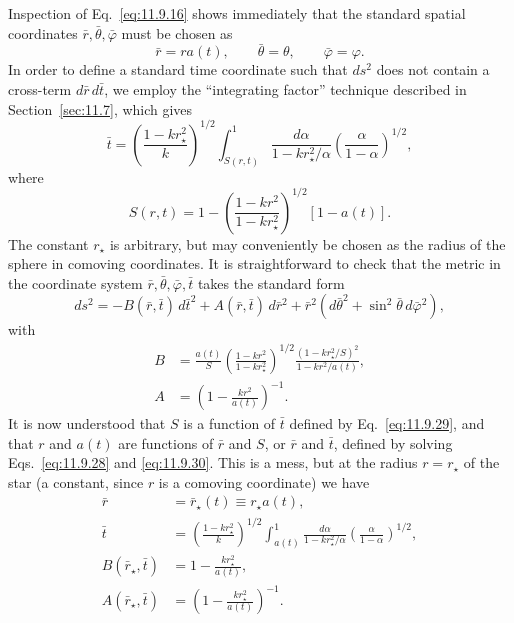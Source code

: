 Inspection of Eq.~\eqref{eq:11.9.16} shows immediately that the standard
spatial coordinates \(\bar r,\bar\theta,\bar\varphi\) must be chosen as
\begin{equation}
  \bar r=ra(t),\qquad
  \bar\theta=\theta,\qquad
  \bar\varphi=\varphi.
  \tag{11.9.28}\label{eq:11.9.28}
\end{equation}
In order to define a standard time coordinate such that \(ds^2\) does not
contain a cross-term \(d\bar r\,d\bar t\), we employ the ``integrating
factor'' technique described in Section~\ref{sec:11.7}, which gives
\begin{equation}
  \bar t
  =
  \left(\frac{1-kr_\star^2}{k}\right)^{1/2}
  \int_{S(r,t)}^1
  \frac{d\alpha}{1-kr_\star^2/\alpha}
  \left(\frac{\alpha}{1-\alpha}\right)^{1/2},
  \tag{11.9.29}\label{eq:11.9.29}
\end{equation}
where
\begin{equation}
  S(r,t)
  =
  1-
  \left(\frac{1-kr^2}{1-kr_\star^2}\right)^{1/2}
  [1-a(t)].
  \tag{11.9.30}\label{eq:11.9.30}
\end{equation}
The constant \(r_\star\) is arbitrary, but may conveniently be chosen as the
radius of the sphere in comoving coordinates. It is straightforward to check
that the metric in the coordinate system
\(\bar r,\bar\theta,\bar\varphi,\bar t\) takes the standard form
\[
  ds^2
  =
  -B(\bar r,\bar t)\,d\bar t^2
  +A(\bar r,\bar t)\,d\bar r^2
  +\bar r^2(d\bar\theta^2+\sin^2\bar\theta\,d\bar\varphi^2),
\]
with
\begin{align}
  B
  &=
  \frac{a(t)}{S}
  \left(\frac{1-kr^2}{1-kr_\star^2}\right)^{1/2}
  \frac{(1-kr_\star^2/S)^2}{1-kr^2/a(t)},
  \tag{11.9.31}\label{eq:11.9.31}\\
  A
  &=
  \left(1-\frac{kr^2}{a(t)}\right)^{-1}.
  \tag{11.9.32}\label{eq:11.9.32}
\end{align}
It is now understood that \(S\) is a function of \(\bar t\) defined by
Eq.~\eqref{eq:11.9.29}, and that \(r\) and \(a(t)\) are functions of
\(\bar r\) and \(S\), or \(\bar r\) and \(\bar t\), defined by solving
Eqs.~\eqref{eq:11.9.28} and \eqref{eq:11.9.30}. This is a mess, but at the
radius \(r=r_\star\) of the star (a constant, since \(r\) is a comoving
coordinate) we have
\begin{align}
  \bar r&=\bar r_\star(t)\equiv r_\star a(t),
  \tag{11.9.33}\label{eq:11.9.33}\\
  \bar t
  &=
  \left(\frac{1-kr_\star^2}{k}\right)^{1/2}
  \int_{a(t)}^1
  \frac{d\alpha}{1-kr_\star^2/\alpha}
  \left(\frac{\alpha}{1-\alpha}\right)^{1/2},
  \tag{11.9.34}\label{eq:11.9.34}\\
  B(\bar r_\star,\bar t)&=1-\frac{kr_\star^2}{a(t)},
  \tag{11.9.35}\label{eq:11.9.35}\\
  A(\bar r_\star,\bar t)&=
  \left(1-\frac{kr_\star^2}{a(t)}\right)^{-1}.
  \tag{11.9.36}\label{eq:11.9.36}
\end{align}
